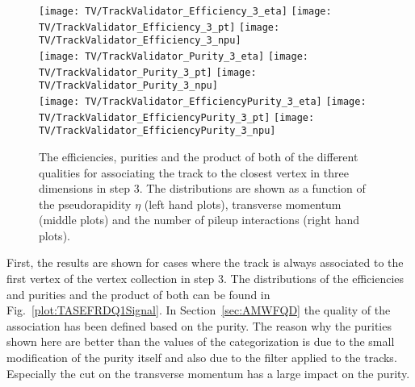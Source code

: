 \begin{figure}[Ht]
    \centering
    \texttt{[image: TV/TrackValidator\_Efficiency\_3\_eta]}
    \texttt{[image: TV/TrackValidator\_Efficiency\_3\_pt]}
    \texttt{[image: TV/TrackValidator\_Efficiency\_3\_npu]}
    \\
    \texttt{[image: TV/TrackValidator\_Purity\_3\_eta]}
    \texttt{[image: TV/TrackValidator\_Purity\_3\_pt]}
    \texttt{[image: TV/TrackValidator\_Purity\_3\_npu]}
    \\
    \texttt{[image: TV/TrackValidator\_EfficiencyPurity\_3\_eta]}
    \texttt{[image: TV/TrackValidator\_EfficiencyPurity\_3\_pt]}
    \texttt{[image: TV/TrackValidator\_EfficiencyPurity\_3\_npu]}
    \caption[Efficiencies, purities and their product of the different qualities of the association map with associating the track to the closest vertex in three dimensions in step 3]{The efficiencies, purities and the product of both of the different qualities for associating the track to the closest vertex in three dimensions in step 3. The distributions are shown as a function of the pseudorapidity $\eta$ (left hand plots), transverse momentum (middle plots) and the number of pileup interactions (right hand plots). \label{plot:TASEFRDQ3Signal}}
\end{figure}

First, the results are shown for cases where the track is always associated to the first vertex of the vertex collection in step 3. The distributions of the efficiencies and purities and the product of both can be found in Fig.~\ref{plot:TASEFRDQ1Signal}. In Section~\ref{sec:AMWFQD} the quality of the association has been defined based on the purity. The reason why the purities shown here are better than the values of the categorization is due to the small modification of the purity itself and also due to the filter applied to the tracks. Especially the cut on the transverse momentum has a large impact on the purity.

